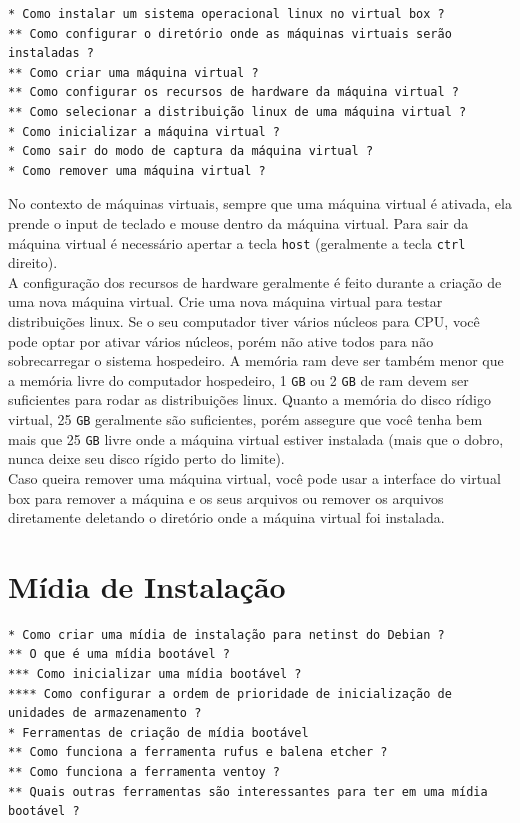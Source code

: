 \documentclass[12pt,a4paper]{article}
\begin{document}
\begin{lstlisting}
* Como instalar um sistema operacional linux no virtual box ?
** Como configurar o diretório onde as máquinas virtuais serão instaladas ?
** Como criar uma máquina virtual ?
** Como configurar os recursos de hardware da máquina virtual ? 
** Como selecionar a distribuição linux de uma máquina virtual ? 
* Como inicializar a máquina virtual ?
* Como sair do modo de captura da máquina virtual ? 
* Como remover uma máquina virtual ? 
\end{lstlisting}

\vspace{\baselineskip}

No contexto de máquinas virtuais, sempre que uma máquina virtual é ativada, ela prende o input de teclado e mouse dentro da máquina virtual. Para sair da máquina virtual é necessário apertar a tecla \texttt{host} (geralmente a tecla \texttt{ctrl} direito). \\

A configuração dos recursos de hardware geralmente é feito durante a criação de uma nova máquina virtual. Crie uma nova máquina virtual para testar distribuições linux. Se o seu computador tiver vários núcleos para CPU, você pode optar por ativar vários núcleos, porém não ative todos para não sobrecarregar o sistema hospedeiro. A memória ram deve ser também menor que a memória livre do computador hospedeiro, 1 \texttt{GB} ou 2 \texttt{GB} de ram devem ser suficientes para rodar as distribuições linux. Quanto a memória do disco rídigo virtual, 25 \texttt{GB} geralmente são suficientes, porém assegure que você tenha bem mais que 25 \texttt{GB} livre onde a máquina virtual estiver instalada (mais que o dobro, nunca deixe seu disco rígido perto do limite). \\

Caso queira remover uma máquina virtual, você pode usar a interface do virtual box para remover a máquina e os seus arquivos ou remover os arquivos diretamente deletando o diretório onde a máquina virtual foi instalada.

\section{Mídia de Instalação} 

\begin{lstlisting}
* Como criar uma mídia de instalação para netinst do Debian ?
** O que é uma mídia bootável ?
*** Como inicializar uma mídia bootável ?
**** Como configurar a ordem de prioridade de inicialização de unidades de armazenamento ? 
* Ferramentas de criação de mídia bootável
** Como funciona a ferramenta rufus e balena etcher ? 
** Como funciona a ferramenta ventoy ?
** Quais outras ferramentas são interessantes para ter em uma mídia bootável ?
\end{lstlisting}
\end{document}
